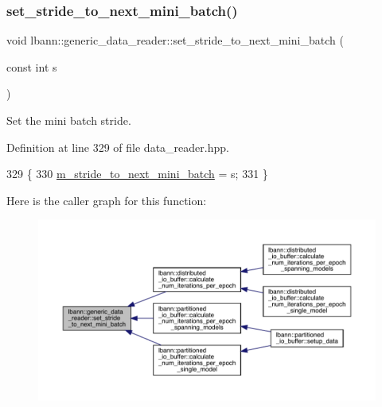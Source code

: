 \subsubsection{\texorpdfstring{set\+\_\+stride\+\_\+to\+\_\+next\+\_\+mini\+\_\+batch()}{set\_stride\_to\_next\_mini\_batch()}}
{\footnotesize\ttfamily void lbann\+::generic\+\_\+data\+\_\+reader\+::set\+\_\+stride\+\_\+to\+\_\+next\+\_\+mini\+\_\+batch (\begin{DoxyParamCaption}\item[{const int}]{s }\end{DoxyParamCaption})\hspace{0.3cm}{\ttfamily [inline]}}



Set the mini batch stride. 



Definition at line 329 of file data\+\_\+reader.\+hpp.


\begin{DoxyCode}
329                                                   \{
330     \hyperlink{classlbann_1_1generic__data__reader_a02c4632cc7cad5c3e4062934c41717a0}{m\_stride\_to\_next\_mini\_batch} = s;
331   \}
\end{DoxyCode}
Here is the caller graph for this function\+:\nopagebreak
\begin{figure}[H]
\begin{center}
\leavevmode
\includegraphics[width=350pt]{classlbann_1_1generic__data__reader_add5bd1d488967ebab5852b636e07db15_icgraph}
\end{center}
\end{figure}
\mbox{\label{classlbann_1_1generic__data__reader_ae6929a8bd2e59da72a8c2e537f0b2b37}} 
